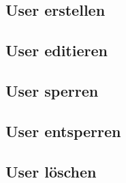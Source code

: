 \subsection{User erstellen}



\subsection{User editieren}

\subsection{User sperren}

\subsection{User entsperren}

\subsection{User löschen}
